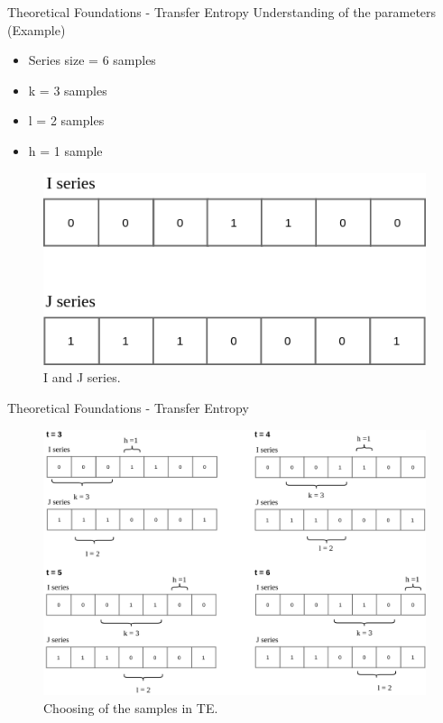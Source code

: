 \begin{frame}{Theoretical Foundations - Transfer Entropy}
Understanding of the parameters (Example)
    \begin{itemize}
        \item Series size = 6 samples
        \item k = 3 samples
        \item l = 2 samples
        \item h = 1 sample
        
    \end{itemize}
    
    \begin{figure}[!h]
        \centering
        \includegraphics[scale=0.4]{figuras/series.png}
        \caption{I and J series.}
        \label{fig:series}
    \end{figure}
\end{frame}

\begin{frame}{Theoretical Foundations - Transfer Entropy}

    \begin{figure}[!h]
        \centering
        \includegraphics[scale=0.25]{figuras/te_sim.png}
        \caption{Choosing of the samples in TE.}
        \label{fig:te_sim}
    \end{figure}
\end{frame}

